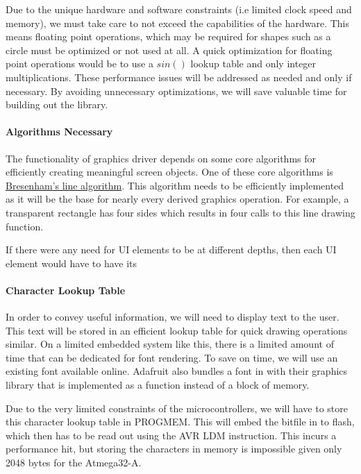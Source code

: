 Due to the unique hardware and software constraints (i.e limited clock speed
and memory), we must take care to not exceed the capabilities of the hardware.
This means floating point operations, which may be required for shapes such as
a circle must be optimized or not used at all. A quick optimization for
floating point operations would be to use a $sin()$ lookup table and only
integer multiplications. These performance issues will be addressed as needed
and only if necessary. By avoiding unnecessary optimizations, we will save
valuable time for building out the library.

\paragraph{Algorithms Necessary}
The functionality of graphics driver depends on some core algorithms for
efficiently creating meaningful screen objects. One of these core algorithms is
\href{https://en.wikipedia.org/wiki/Bresenham\%27s_line_algorithm}{Bresenham's
line algorithm}. This algorithm needs to be efficiently implemented as it will
be the base for nearly every derived graphics operation. For example, a
transparent rectangle has four sides which results in four calls to this line
drawing function.

If there were any need for UI elements to be at different depths, then each UI
element would have to have its

\paragraph{Character Lookup Table}
In order to convey useful information, we will need to display text to the
user. This text will be stored in an efficient lookup table for quick drawing
operations similar. On a limited embedded
system like this, there is a limited amount of time that can be dedicated for
font rendering. To save on time, we will use an existing font available online.
Adafruit also bundles a font in with their graphics library that is implemented
as a function instead of a block of memory.

Due to the very limited constraints of the microcontrollers, we will have to
store this character lookup table in PROGMEM. This will embed the bitfile in to
flash, which then has to be read out using the AVR LDM instruction. This incurs
a performance hit, but storing the characters in memory is impossible given
only 2048 bytes for the Atmega32-A.

